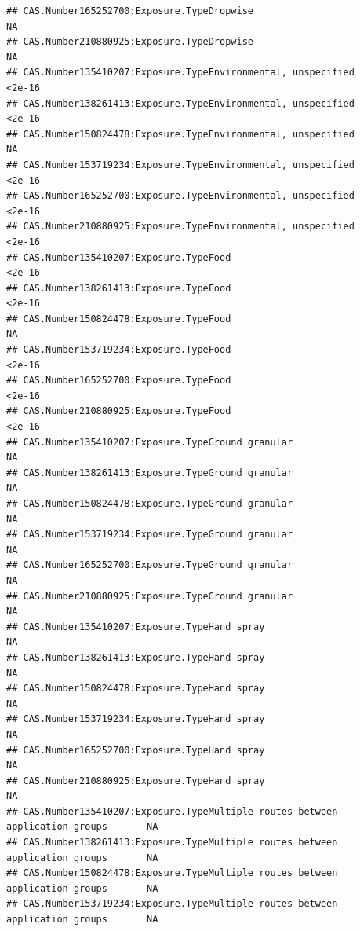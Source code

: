 \documentclass[
  12pt,
]{article}
\begin{document}
\begin{verbatim}
## CAS.Number165252700:Exposure.TypeDropwise                                         NA
## CAS.Number210880925:Exposure.TypeDropwise                                         NA
## CAS.Number135410207:Exposure.TypeEnvironmental, unspecified                   <2e-16
## CAS.Number138261413:Exposure.TypeEnvironmental, unspecified                   <2e-16
## CAS.Number150824478:Exposure.TypeEnvironmental, unspecified                       NA
## CAS.Number153719234:Exposure.TypeEnvironmental, unspecified                   <2e-16
## CAS.Number165252700:Exposure.TypeEnvironmental, unspecified                   <2e-16
## CAS.Number210880925:Exposure.TypeEnvironmental, unspecified                   <2e-16
## CAS.Number135410207:Exposure.TypeFood                                         <2e-16
## CAS.Number138261413:Exposure.TypeFood                                         <2e-16
## CAS.Number150824478:Exposure.TypeFood                                             NA
## CAS.Number153719234:Exposure.TypeFood                                         <2e-16
## CAS.Number165252700:Exposure.TypeFood                                         <2e-16
## CAS.Number210880925:Exposure.TypeFood                                         <2e-16
## CAS.Number135410207:Exposure.TypeGround granular                                  NA
## CAS.Number138261413:Exposure.TypeGround granular                                  NA
## CAS.Number150824478:Exposure.TypeGround granular                                  NA
## CAS.Number153719234:Exposure.TypeGround granular                                  NA
## CAS.Number165252700:Exposure.TypeGround granular                                  NA
## CAS.Number210880925:Exposure.TypeGround granular                                  NA
## CAS.Number135410207:Exposure.TypeHand spray                                       NA
## CAS.Number138261413:Exposure.TypeHand spray                                       NA
## CAS.Number150824478:Exposure.TypeHand spray                                       NA
## CAS.Number153719234:Exposure.TypeHand spray                                       NA
## CAS.Number165252700:Exposure.TypeHand spray                                       NA
## CAS.Number210880925:Exposure.TypeHand spray                                       NA
## CAS.Number135410207:Exposure.TypeMultiple routes between application groups       NA
## CAS.Number138261413:Exposure.TypeMultiple routes between application groups       NA
## CAS.Number150824478:Exposure.TypeMultiple routes between application groups       NA
## CAS.Number153719234:Exposure.TypeMultiple routes between application groups       NA

\end{verbatim}
\end{document}
